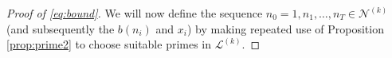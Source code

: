 \documentclass[a4paper,10pt]{amsart}
\numberwithin{equation}{section}
\numberwithin{equation}{section}
\theoremstyle{plain}
\theoremstyle{definition}
\newtheorem{rmk}[thm]{Remark}
\theoremstyle{definition}
\theoremstyle{plain}
\theoremstyle{plain}
\theoremstyle{plain}
\theoremstyle{plain}
\newcommand{\ind}{\operatorname{ind}}
\newcommand{\F}{\mathcal{F}}
\newcommand{\fm}{\mathfrak{m}}
\newcommand{\rH}{\mathrm{H}}
\begin{document}
\begin{proof}[Proof of \eqref{eq:bound}]

We will now define the sequence $n_0=1, n_1, \dots, n_T \in \mathscr{N}^{(k)}$ (and subsequently the $b(n_i)$ and $x_i$) by making repeated use of Proposition \ref{prop:prime2} to choose suitable primes in $\mathscr{L}^{(k)}$. 


\end{proof}
\end{document}
